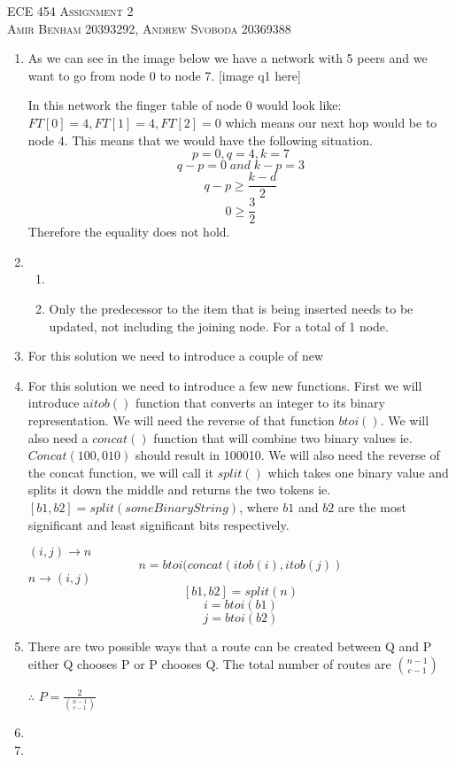 \documentclass{article}
\begin{document}
\begin{center}
\textsc{\Large ECE 454 Assignment 2}\\[0.5cm]
\textsc{Amir Benham 20393292, Andrew Svoboda 20369388}\\[0.5cm]
\end{center}

\begin{enumerate}

	\item As we can see in the image below we have a network with 5 peers and we want to go from node 0 to node 7.
		[image q1 here]
	
	In this network the finger table of node 0 would look like: \(FT[0]=4, FT[1]=4, FT[2]=0\) which means our next hop would be to node 4. This means that we would have the following situation.
\[
p=0, q=4 , k=7
\]
\[
q-p=0 \; and\;  k-p=3
\]
\[
q-p \ge \frac{k-d}{2}
\]
\[
0\ge \frac{3}{2}
\]
Therefore the equality does not hold.

\item
 \begin{enumerate}
	\item
	\item Only the predecessor to the item that is being inserted needs to be updated, not including the joining node. For a total of 1 node.
\end{enumerate}
\item For this solution we need to introduce a couple of new 

\item For this solution we need to introduce a few new functions. First we will introduce a\( itob()\) function that converts an integer to its binary representation. We will need the reverse of that function \(btoi()\). We will also need a \(concat()\) function that will combine two binary values ie. \(Concat(100,010)\) should result in 100010.  We will also need the reverse of the concat function, we will call it \(split()\) which takes one binary value and splits it down the middle and returns the two tokens ie. \([b1,b2]=split(someBinaryString)\), where \( b1\) and \(b2\) are the most significant and least significant bits respectively.

\((i,j)\rightarrow n\)
\[
n=btoi(concat(itob(i),itob(j))
\]
\(n\rightarrow(i,j)\)
\[
[b1,b2]=split(n)
\]
\[
i=btoi(b1)
\]
\[
j=btoi(b2)
\]
	
\item
There are two possible ways that a route can be created between Q and P either Q chooses P or P chooses Q. The total number of routes are \( \binom{n-1}{c-1}\)

\centerline{\Large$ \therefore $
\(
 P= \frac {2}{\binom{n-1}{c-1}}
\)
}

\item

\item

\end{enumerate}
\end{document}
